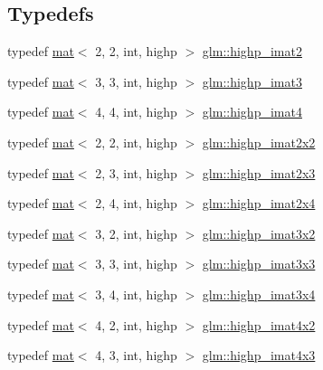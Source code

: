 \subsection*{Typedefs}
\begin{DoxyCompactItemize}
\item 
typedef \hyperlink{structglm_1_1mat}{mat}$<$ 2, 2, int, highp $>$ \hyperlink{group__gtc__matrix__integer_ga5b3d41917c60488d2babd72ca26d01ba}{glm\+::highp\+\_\+imat2}
\item 
typedef \hyperlink{structglm_1_1mat}{mat}$<$ 3, 3, int, highp $>$ \hyperlink{group__gtc__matrix__integer_ga3a8088cb8c764ec1c3719f31b3687ba8}{glm\+::highp\+\_\+imat3}
\item 
typedef \hyperlink{structglm_1_1mat}{mat}$<$ 4, 4, int, highp $>$ \hyperlink{group__gtc__matrix__integer_ga2f3fec7874f434d081a186d11ccbed3c}{glm\+::highp\+\_\+imat4}
\item 
typedef \hyperlink{structglm_1_1mat}{mat}$<$ 2, 2, int, highp $>$ \hyperlink{group__gtc__matrix__integer_ga9d5c6c5a4640f7c794a77e3f60b91670}{glm\+::highp\+\_\+imat2x2}
\item 
typedef \hyperlink{structglm_1_1mat}{mat}$<$ 2, 3, int, highp $>$ \hyperlink{group__gtc__matrix__integer_ga6bf015d7d01115e1d71362f2aa1cd3c4}{glm\+::highp\+\_\+imat2x3}
\item 
typedef \hyperlink{structglm_1_1mat}{mat}$<$ 2, 4, int, highp $>$ \hyperlink{group__gtc__matrix__integer_ga5e3a9d05895fbefef19c051e60ca81c4}{glm\+::highp\+\_\+imat2x4}
\item 
typedef \hyperlink{structglm_1_1mat}{mat}$<$ 3, 2, int, highp $>$ \hyperlink{group__gtc__matrix__integer_gaf5097ad25b9a991ad010aba6736b333e}{glm\+::highp\+\_\+imat3x2}
\item 
typedef \hyperlink{structglm_1_1mat}{mat}$<$ 3, 3, int, highp $>$ \hyperlink{group__gtc__matrix__integer_ga56dfcd09960c88895e72cbdcddc08ae6}{glm\+::highp\+\_\+imat3x3}
\item 
typedef \hyperlink{structglm_1_1mat}{mat}$<$ 3, 4, int, highp $>$ \hyperlink{group__gtc__matrix__integer_ga01595d765e0fef9bf01df5e20a811cd3}{glm\+::highp\+\_\+imat3x4}
\item 
typedef \hyperlink{structglm_1_1mat}{mat}$<$ 4, 2, int, highp $>$ \hyperlink{group__gtc__matrix__integer_gac3bc64ec9129474635c6973f79c149a7}{glm\+::highp\+\_\+imat4x2}
\item 
typedef \hyperlink{structglm_1_1mat}{mat}$<$ 4, 3, int, highp $>$ \hyperlink{group__gtc__matrix__integer_ga03ddba7301f182bf5cb1e66a6aa43bcb}{glm\+::highp\+\_\+imat4x3}

\end{DoxyCompactItemize}

